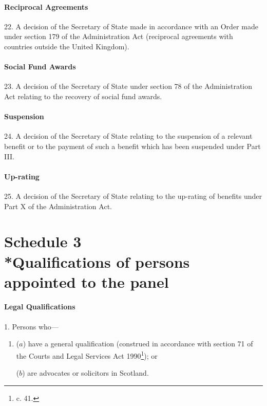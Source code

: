 \documentclass[12pt,a4paper]{article}
\begin{document}
\subsection*{Reciprocal Agreements}

22.  A decision of the Secretary of State made in accordance with an Order made under section 179 of the Administration Act (reciprocal agreements with countries outside the United Kingdom).

\subsection*{Social Fund Awards}

23.  A decision of the Secretary of State under section 78 of the Administration Act relating to the recovery of social fund awards.

\subsection*{Suspension}

24.  A decision of the Secretary of State relating to the suspension of a relevant benefit or to the payment of such a benefit which has been suspended under Part III.

\subsection*{Up-rating}

25.  A decision of the Secretary of State relating to the up-rating of benefits under Part X of the Administration Act.

\part[Schedule 3 --- Qualifications of persons appointed to the panel]{Schedule 3\\*Qualifications of persons appointed to the panel}

\subsection*{Legal Qualifications}

\renewcommand\parthead{--- Schedule 3}

1.  Persons who—
\begin{enumerate}\item[]
($a$) have a general qualification (construed in accordance with section 71 of the Courts and Legal Services Act 1990\footnote{ c. 41.}); or

($b$) are advocates or solicitors in Scotland.
\end{enumerate}
\end{document}
